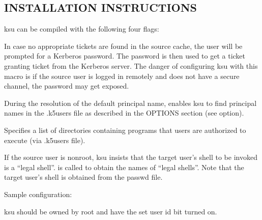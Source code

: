 \documentclass[letterpaper,10pt,english]{sphinxmanual}
\begin{document}
\subsection{INSTALLATION INSTRUCTIONS}
\label{\detokenize{user/user_commands/ksu:installation-instructions}}
\sphinxAtStartPar
ksu can be compiled with the following four flags:
\begin{description}
\sphinxAtStartPar
In case no appropriate tickets are found in the source cache, the
user will be prompted for a Kerberos password.  The password is
then used to get a ticket granting ticket from the Kerberos
server.  The danger of configuring ksu with this macro is if the
source user is logged in remotely and does not have a secure
channel, the password may get exposed.

\sphinxAtStartPar
During the resolution of the default principal name,
 enables ksu to find principal names in
the .k5users file as described in the OPTIONS section
(see  option).

\sphinxAtStartPar
Specifies a list of directories containing programs that users are
authorized to execute (via .k5users file).

\sphinxAtStartPar
If the source user is non\sphinxhyphen{}root, ksu insists that the target user’s
shell to be invoked is a “legal shell”.   is
called to obtain the names of “legal shells”.  Note that the
target user’s shell is obtained from the passwd file.

\end{description}

\sphinxAtStartPar
Sample configuration:

\begin{sphinxVerbatim}[commandchars=\\\{\}]
    
\end{sphinxVerbatim}

\sphinxAtStartPar
ksu should be owned by root and have the set user id bit turned on.
\end{document}
